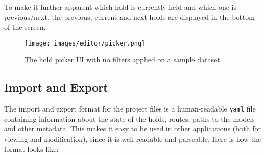 To make it further apparent which hold is currently held and which one is previous/next, the previous, current and next holds are displayed in the bottom of the screen.

\begin{figure}[h]
	\centering
	\texttt{[image: images/editor/picker.png]}%
	\caption{The hold picker UI with no filters applied on a sample dataset.}%
	\label{fig:picker}
\end{figure}

\subsection{Import and Export}
The import and export format for the project files is a human-readable \verb|yaml| file containing information about the state of the holds, routes, paths to the models and other metadata.
This makes it easy to be used in other applications (both for viewing and modification), since it is well readable and parseable.
Here is how the format looks like:

